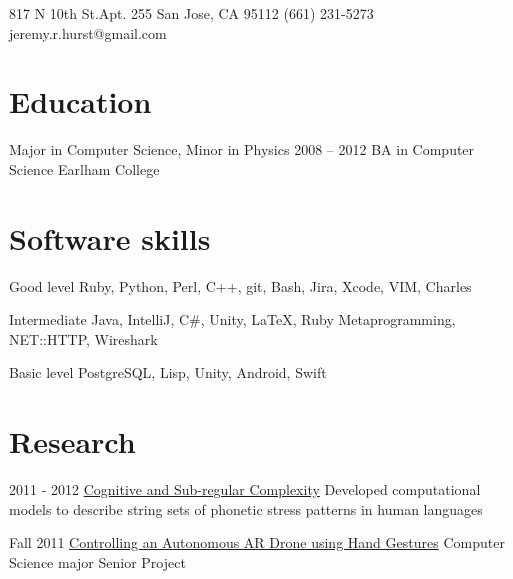 \documentclass[oldfontcommands]{tccv}
\begin{document}
\personal
    {817 N 10th St.\newline Apt. 255 \newline San Jose, CA 95112}
    {(661) 231-5273}
    {jeremy.r.hurst@gmail.com}

\section{Education}

\begin{yearlist}

\item[Major in Computer Science, Minor in Physics]{2008 -- 2012}
     {BA in Computer Science}
     {Earlham College}

\end{yearlist}

\section{Software skills}

\begin{factlist}

\item{Good level}
     {Ruby, Python, Perl, C++, git, Bash, Jira, Xcode, VIM, Charles}

\item{Intermediate}
     {Java, IntelliJ, C\#, Unity, \LaTeX, Ruby Metaprogramming, NET::HTTP, Wireshark}

\item{Basic level}
     {PostgreSQL, Lisp, Unity, Android, Swift}

\end{factlist}

\section{Research}

\begin{yearlist}
\item{2011 - 2012}
     {\href{http://link.springer.com/chapter/10.1007/978-3-642-39998-5_6\#page-1}{Cognitive and Sub-regular Complexity}}
     {Developed computational models to describe string sets of phonetic stress patterns in human languages}

\item{Fall 2011}
     {\href{https://www.youtube.com/watch?v=69phrToFKyI}{Controlling an Autonomous AR Drone using Hand Gestures}}
     {Computer Science major Senior Project}
\end{yearlist}
\end{document}
